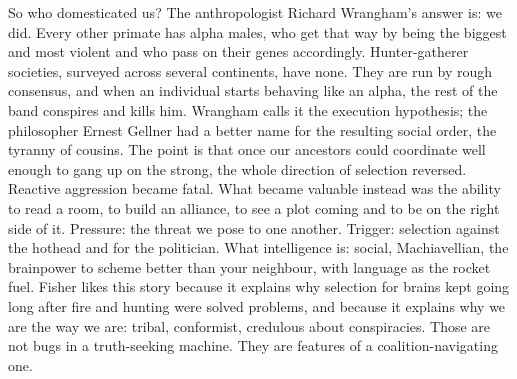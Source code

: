 So who domesticated us? The anthropologist Richard Wrangham's answer is: we did. Every other primate has alpha males, who get that way by being the biggest and most violent and who pass on their genes accordingly. Hunter-gatherer societies, surveyed across several continents, have none. They are run by rough consensus, and when an individual starts behaving like an alpha, the rest of the band conspires and kills him. Wrangham calls it the execution hypothesis; the philosopher Ernest Gellner had a better name for the resulting social order, the tyranny of cousins. The point is that once our ancestors could coordinate well enough to gang up on the strong, the whole direction of selection reversed. Reactive aggression became fatal. What became valuable instead was the ability to read a room, to build an alliance, to see a plot coming and to be on the right side of it. Pressure: the threat we pose to one another. Trigger: selection against the hothead and for the politician. What intelligence is: social, Machiavellian, the brainpower to scheme better than your neighbour, with language as the rocket fuel. Fisher likes this story because it explains why selection for brains kept going long after fire and hunting were solved problems, and because it explains why we are the way we are: tribal, conformist, credulous about conspiracies. Those are not bugs in a truth-seeking machine. They are features of a coalition-navigating one.

